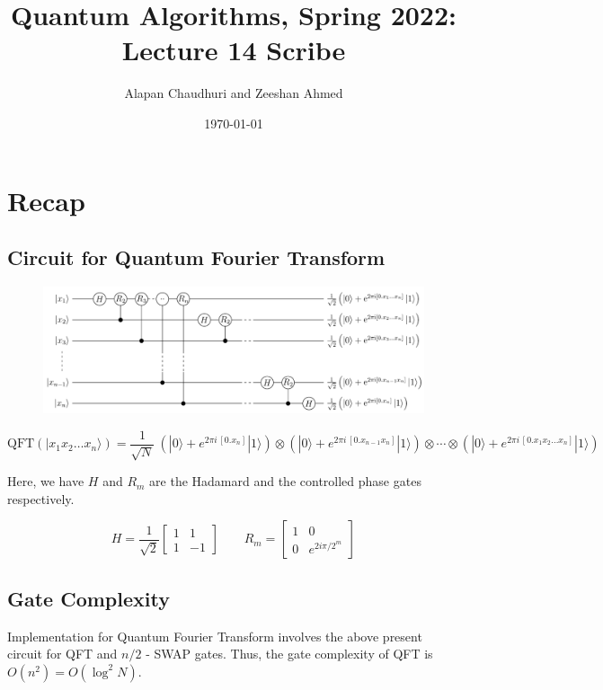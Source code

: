 \documentclass[11.5pt, paper=a4]{article}
\title{Quantum Algorithms, Spring 2022: Lecture 14 Scribe}
\author{Alapan Chaudhuri and Zeeshan Ahmed}
\date{\today}
\theoremstyle{definition}
\numberwithin{theorem}{section}
\begin{document}
\maketitle

\section{Recap}

\subsection{Circuit for Quantum Fourier Transform}
\begin{figure}[!htbp]
    \centering
    \includegraphics[width=\linewidth]{images/qft.png}
\end{figure}

$$\text{QFT}(|x_{1}x_{2}\ldots x_{n}\rangle )={\frac {1}{\sqrt {N}}}\ \left(|0\rangle +e^{2\pi i\,[0.x_{n}]}|1\rangle \right)\otimes \left(|0\rangle +e^{2\pi i\,[0.x_{n-1}x_{n}]}|1\rangle \right)\otimes \cdots \otimes \left(|0\rangle +e^{2\pi i\,[0.x_{1}x_{2}\ldots x_{n}]}|1\rangle \right)$$

Here, we have $H$ and $R_m$ are the Hadamard and the controlled phase gates respectively.

$$H = \frac{1}{\sqrt 2} \begin{bmatrix}
1 & 1\\
1 & -1
\end{bmatrix}\ \ \ \ \ \ \ \ \ R_m = \begin{bmatrix}
1 & 0\\
0 & e^{2i\pi/2^m}
\end{bmatrix}$$

\subsection{Gate Complexity}
Implementation for Quantum Fourier Transform involves the above present circuit for QFT and $n/2$ - SWAP gates. Thus, the gate complexity of QFT is $O(n^2) = O(\log^2 N)$.
\end{document}
